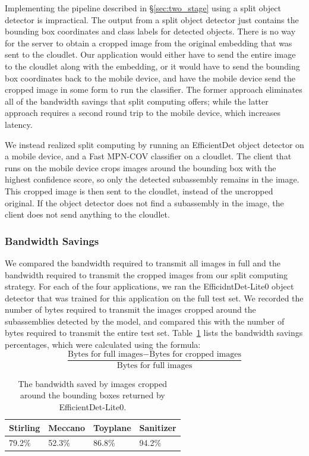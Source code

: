 Implementing the pipeline described in \S\ref{sec:two_stage} using a split
object detector is impractical.
The output from a split object detector just contains the bounding box
coordinates and class labels for detected objects.
There is no way for the server to obtain a cropped image from the original
embedding that was sent to the cloudlet.
Our application would either have to send the entire image to the cloudlet along
with the embedding, or it would have to send the bounding box coordinates back
to the mobile device, and have the mobile device send the cropped image in some
form to run the classifier.
The former approach eliminates all of the bandwidth savings that split computing
offers; while the latter approach requires a second round trip to the mobile
device, which increases latency.

We instead realized split computing by running an EfficientDet object detector
on a mobile device, and a Fast MPN-COV classifier on a cloudlet.
The client that runs on the mobile device crops images around the bounding box
with the highest confidence score, so only the detected subassembly remains in
the image.
This cropped image is then sent to the cloudlet, instead of the uncropped
original.
If the object detector does not find a subassembly in the image, the client does
not send anything to the cloudlet.

\subsubsection{Bandwidth Savings}

We compared the bandwidth required to transmit all images in full and the
bandwidth required to transmit the cropped images from our split computing
strategy.
For each of the four applications, we ran the EfficidntDet-Lite0 object detector
that was trained for this application on the full test set.
We recorded the number of bytes required to transmit the images cropped around
the subassemblies detected by the model, and compared this with the number of
bytes required to transmit the entire test set.
Table~\ref{tab:bandwidth} lists the bandwidth savings percentages, which were
calculated using the formula:
\[
  \frac{\text{Bytes for full images} - \text{Bytes for cropped images}}{
    \text{Bytes for full images}}
\]

\begin{table}
  \begin{tabular}{|l|l|l|l|}
  \hline
  Stirling & Meccano & Toyplane & Sanitizer\\
  \hline
  \hline
  79.2\% & 52.3\% & 86.8\% & 94.2\%\\
  \hline
\end{tabular}
\caption{
  The bandwidth saved by images cropped around the bounding boxes returned by
  EfficientDet-Lite0.
}\label{tab:bandwidth}
\end{table}


